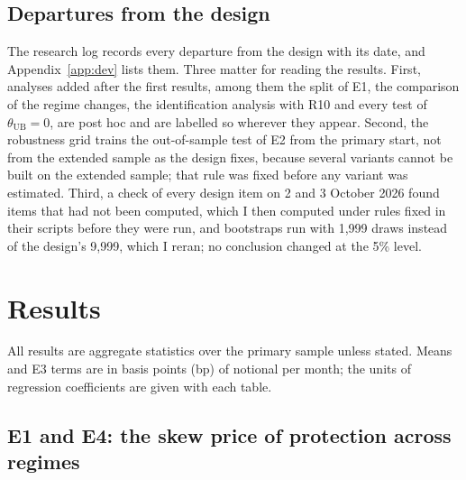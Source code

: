 \documentclass[11pt]{article}
\theoremstyle{result}
\newcommand{\thUB}{\theta_{\mathrm{UB}}}
\begin{document}
\subsection{Departures from the design}\label{sec:dev}

The research log records every departure from the design with its date, and Appendix~\ref{app:dev} lists them. Three matter for reading the results. First, analyses added after the first results, among them the split of E1, the comparison of the regime changes, the identification analysis with R10 and every test of $\thUB=0$, are post hoc and are labelled so wherever they appear. Second, the robustness grid trains the out-of-sample test of E2 from the primary start, not from the extended sample as the design fixes, because several variants cannot be built on the extended sample; that rule was fixed before any variant was estimated. Third, a check of every design item on 2 and 3 October 2026 found items that had not been computed, which I then computed under rules fixed in their scripts before they were run, and bootstraps run with 1,999 draws instead of the design's 9,999, which I reran; no conclusion changed at the 5\% level.

\section{Results}\label{sec:results}

All results are aggregate statistics over the primary sample unless stated. Means and E3 terms are in basis points (bp) of notional per month; the units of regression coefficients are given with each table.

\subsection{E1 and E4: the skew price of protection across regimes}\label{sec:e1}
\end{document}
